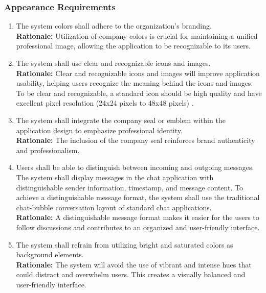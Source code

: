 \documentclass[]{article}
\begin{document}
\subsubsection{Appearance Requirements}
\label{ssub:appearance_requirements}
\begin{enumerate}[{LF-A}1. ]
	\item The system colors shall adhere to the organization's branding. \\
	      {\bf Rationale:} Utilization of company colors is crucial for maintaining a unified professional image, allowing the application to be
	      recognizable to its users.
	\item The system shall use clear and recognizable icons and images. \\
	      {\bf Rationale:} Clear and recognizable icons and images will improve application usability, helping users recognize the meaning behind
	      the icons and images. To be clear and recognizable, a standard icon should be high quality and have excellent pixel resolution (24x24 pixels to 48x48 pixels)
	      \cite{1c}.
	\item The system shall integrate the company seal or emblem within the application design to emphasize professional identity. \\
	      {\bf Rationale:} The inclusion of the company seal reinforces brand authenticity and professionalism.
	\item Users shall be able to distinguish between incoming and outgoing messages. The system shall display messages in the chat application with distinguishable sender information, timestamp, and message content.
	      To achieve a distinguishable message format, the system shall use the traditional chat-bubble conversation layout of standard
	      chat applications.\\
	      {\bf Rationale:} A distinguishable message format makes it easier for the users to follow discussions and contributes to an organized and
	      user-friendly interface.
	\item The system shall refrain from utilizing bright and saturated colors as background elements. \\
	      {\bf Rationale:} The system will avoid the use of vibrant and intense hues that could distract and overwhelm users. This creates a
	      visually balanced and user-friendly interface.
\end{enumerate}
\end{document}
